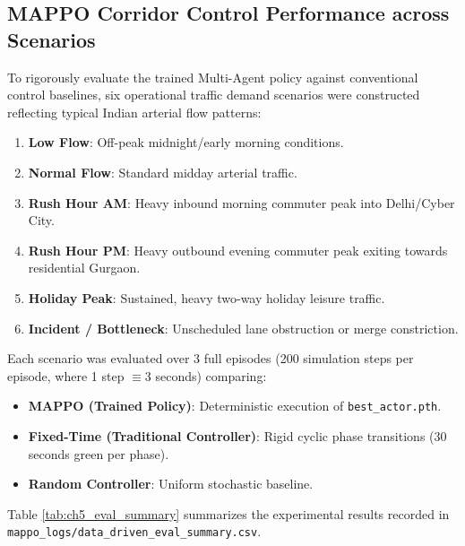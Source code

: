 \documentclass[12pt,a4paper,oneside]{report}
\begin{document}
\subsection{MAPPO Corridor Control Performance across Scenarios}
To rigorously evaluate the trained Multi-Agent policy against conventional control baselines, six operational traffic demand scenarios were constructed reflecting typical Indian arterial flow patterns:
\begin{enumerate}
    \item \textbf{Low Flow}: Off-peak midnight/early morning conditions.
    \item \textbf{Normal Flow}: Standard midday arterial traffic.
    \item \textbf{Rush Hour AM}: Heavy inbound morning commuter peak into Delhi/Cyber City.
    \item \textbf{Rush Hour PM}: Heavy outbound evening commuter peak exiting towards residential Gurgaon.
    \item \textbf{Holiday Peak}: Sustained, heavy two-way holiday leisure traffic.
    \item \textbf{Incident / Bottleneck}: Unscheduled lane obstruction or merge constriction.
\end{enumerate}

Each scenario was evaluated over 3 full episodes (200 simulation steps per episode, where 1 step $\equiv 3$ seconds) comparing:
\begin{itemize}
    \item \textbf{MAPPO (Trained Policy)}: Deterministic execution of \texttt{best\_actor.pth}.
    \item \textbf{Fixed-Time (Traditional Controller)}: Rigid cyclic phase transitions (30 seconds green per phase).
    \item \textbf{Random Controller}: Uniform stochastic baseline.
\end{itemize}

Table \ref{tab:ch5_eval_summary} summarizes the experimental results recorded in \texttt{mappo\_logs/data\_driven\_eval\_summary.csv}.
\end{document}
